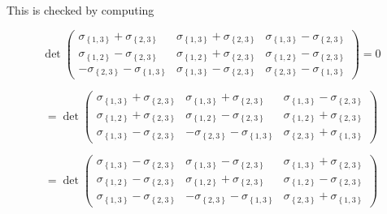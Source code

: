 \documentclass[11pt]{article}
\begin{document}
This is checked by computing

\begin{equation*}
\det \left( 
\begin{array}{ccc}
\sigma _{\left\{ 1,3\right\} }+\sigma _{\left\{ 2,3\right\} } & \sigma
_{\left\{ 1,3\right\} }+\sigma _{\left\{ 2,3\right\} } & \sigma _{\left\{
1,3\right\} }-\sigma _{\left\{ 2,3\right\} } \\ 
\sigma _{\left\{ 1,2\right\} }-\sigma _{\left\{ 2,3\right\} } & \sigma
_{\left\{ 1,2\right\} }+\sigma _{\left\{ 2,3\right\} } & \sigma _{\left\{
1,2\right\} }-\sigma _{\left\{ 2,3\right\} } \\ 
-\sigma _{\left\{ 2,3\right\} }-\sigma _{\left\{ 1,3\right\} } & \sigma
_{\left\{ 1,3\right\} }-\sigma _{\left\{ 2,3\right\} } & \sigma _{\left\{
2,3\right\} }-\sigma _{\left\{ 1,3\right\} }%
\end{array}%
\right) =0
\end{equation*}

\begin{equation*}
=\det \left( 
\begin{array}{ccc}
\sigma _{\left\{ 1,3\right\} }+\sigma _{\left\{ 2,3\right\} } & \sigma
_{\left\{ 1,3\right\} }+\sigma _{\left\{ 2,3\right\} } & \sigma _{\left\{
1,3\right\} }-\sigma _{\left\{ 2,3\right\} } \\ 
\sigma _{\left\{ 1,2\right\} }+\sigma _{\left\{ 2,3\right\} } & \sigma
_{\left\{ 1,2\right\} }-\sigma _{\left\{ 2,3\right\} } & \sigma _{\left\{
1,2\right\} }+\sigma _{\left\{ 2,3\right\} } \\ 
\sigma _{\left\{ 1,3\right\} }-\sigma _{\left\{ 2,3\right\} } & -\sigma
_{\left\{ 2,3\right\} }-\sigma _{\left\{ 1,3\right\} } & \sigma _{\left\{
2,3\right\} }+\sigma _{\left\{ 1,3\right\} }%
\end{array}%
\right)
\end{equation*}

\begin{equation*}
=\det \left( 
\begin{array}{ccc}
\sigma _{\left\{ 1,3\right\} }-\sigma _{\left\{ 2,3\right\} } & \sigma
_{\left\{ 1,3\right\} }-\sigma _{\left\{ 2,3\right\} } & \sigma _{\left\{
1,3\right\} }+\sigma _{\left\{ 2,3\right\} } \\ 
\sigma _{\left\{ 1,2\right\} }-\sigma _{\left\{ 2,3\right\} } & \sigma
_{\left\{ 1,2\right\} }+\sigma _{\left\{ 2,3\right\} } & \sigma _{\left\{
1,2\right\} }-\sigma _{\left\{ 2,3\right\} } \\ 
\sigma _{\left\{ 1,3\right\} }-\sigma _{\left\{ 2,3\right\} } & -\sigma
_{\left\{ 2,3\right\} }-\sigma _{\left\{ 1,3\right\} } & \sigma _{\left\{
2,3\right\} }+\sigma _{\left\{ 1,3\right\} }%
\end{array}%
\right)
\end{equation*}
\end{document}
